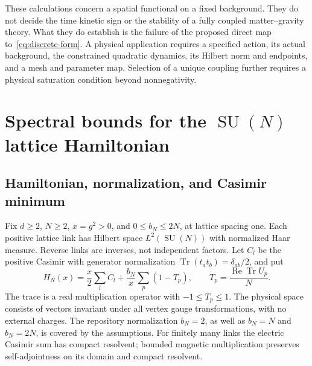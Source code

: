 \documentclass[11pt,letterpaper]{article}
\newcommand{\SU}{\operatorname{SU}}
\newcommand{\Tr}{\operatorname{Tr}}
\theoremstyle{definition}
\numberwithin{equation}{section}
\begin{document}
These calculations concern a spatial functional on a fixed background.
They do not decide the time kinetic sign or the stability of a fully
coupled matter--gravity theory. What they do establish is the failure of
the proposed direct map to~\eqref{eq:discrete-form}. A physical application
requires a specified action, its actual background, the constrained
quadratic dynamics, its Hilbert norm and endpoints, and a mesh and parameter
map. Selection of a unique coupling further requires a physical saturation
condition beyond nonnegativity.

\section{Spectral bounds for the \texorpdfstring{$\SU(N)$}{SU(N)} lattice Hamiltonian}
\label{sec:gauge}

\subsection{Hamiltonian, normalization, and Casimir minimum}

Fix $d\ge2$, $N\ge2$, $x=g^2>0$, and $0\le b_N\le2N$, at lattice
spacing one. Each positive lattice link has Hilbert space
$L^2(\SU(N))$ with normalized Haar measure. Reverse links are inverses,
not independent factors. Let $C_l$ be the positive Casimir with generator
normalization $\Tr(t_at_b)=\delta_{ab}/2$, and put
\begin{equation}
 H_N(x)=\frac x2\sum_l C_l+\frac{b_N}{x}\sum_p(1-T_p),
 \qquad T_p=\frac{\operatorname{Re}\Tr U_p}{N}.
 \label{eq:lattice-H}
\end{equation}
The trace is a real multiplication operator with $-1\le T_p\le1$.
The physical space consists of vectors invariant under all vertex gauge
transformations, with no external charges. The repository normalization
$b_N=2$, as well as $b_N=N$ and $b_N=2N$, is covered by the assumptions.
For finitely many links the electric Casimir sum has compact resolvent;
bounded magnetic multiplication preserves self-adjointness on its domain
and compact resolvent.
\end{document}
